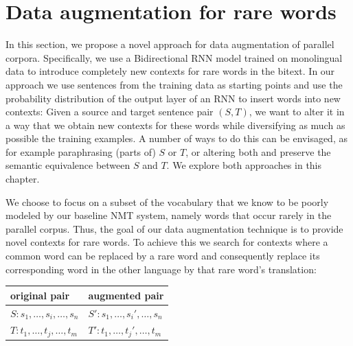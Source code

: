 
\section{Data augmentation for rare words} \label{tda:model}

In this section, we propose a novel approach for data augmentation of parallel corpora. Specifically, we use a Bidirectional RNN model trained on monolingual data to introduce completely new contexts for rare words in the bitext. In our approach we use sentences from the training data as starting points and use the probability distribution of the output layer of an RNN to insert words into new contexts: 
Given %
a source and target sentence pair $(S,T)$, we want to alter it in a way that we obtain new contexts for these words while diversifying as much as possible the training examples.
A number of ways to do this can be envisaged, as for example paraphrasing (parts of) $S$ or $T$, or altering both and preserve the semantic equivalence between $S$ and $T$.
We explore both approaches in this chapter.

We choose to focus on a subset of the vocabulary that we know to be poorly modeled by our baseline NMT system, namely words that occur rarely in the parallel corpus.
Thus, the goal of our data augmentation technique is to provide novel contexts for rare words.
To achieve this we search for contexts where a common word can be replaced by a rare word and consequently replace its corresponding word in the other language by that rare word's translation:
\vspace{1mm}

\begin{center}\small
\setlength{\tabcolsep}{15pt}
\begin{tabular}{ll}
\textbf{original pair} & \textbf{augmented pair} \\\hline
$S: s_1, \ldots , s_i, \ldots, s_n$ & $S': s_1, \ldots , s_i', \ldots , s_n$ \\
$T: t_1, \ldots , t_j, \ldots , t_m$ & $T': t_1, \ldots , t_j', \ldots , t_m$ \\ %
\end{tabular}
\end{center}

